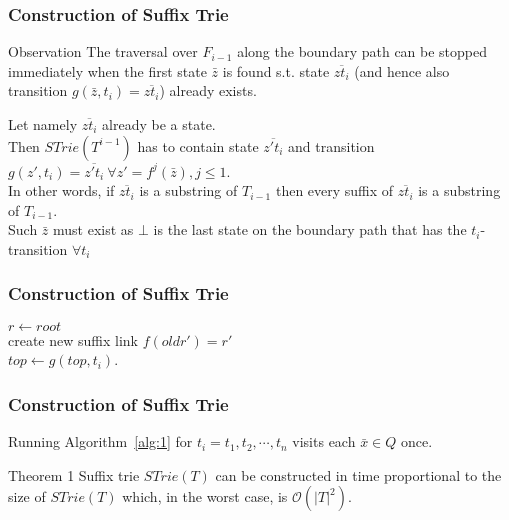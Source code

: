 \documentclass[compress,usenames,dvipsnames]{beamer}
\newenvironment{theoremblock}[1]{
    \setbeamercolor{block title}{bg=Emerald}
    \begin{block}{#1}}{\end{block}
}
\begin{document}
        \begin{frame} \frametitle{Construction of Suffix Trie}
            \begin{block}{Observation}
                The traversal over $F_{i-1}$ along the boundary path can be stopped immediately when the first state $\bar{z}$ is found s.t. state $\overline{zt_i}$ (and hence also transition $g(\bar{z}, t_i) = \overline{zt_i}$) already exists.
            \end{block}
            Let namely $\overline{zt_i}$ already be a state. \\
            \hfill \break
            Then $STrie(T^{i-1})$ has to contain state $\overline{z't_i}$ and transition $g(z', t_i) = \overline{z't_i} \ \forall z' = f^j(\bar{z}), j \leq 1$. \\
            In other words, if $\overline{zt_i}$ is a substring of $T_{i-1}$ then every suffix of $\overline{zt_i}$ is a substring of $T_{i-1}$.\\
            \hfill \break
            Such $\bar{z}$ must exist as $\bot$ is the last state on the boundary path that has the $t_i$-transition $\forall t_i$
        \end{frame}

        \begin{frame}\frametitle{Construction of Suffix Trie}
            \LinesNumbered
            \begin{algorithm}[H]
                \SetAlgoNoEnd
                $r \leftarrow root$ \\
                create new suffix link $f(oldr') = r'$ \\
                $top \leftarrow g(top, t_i)$.
            \caption{}
            \label{alg:1}
            \end{algorithm}
        \end{frame}

        \begin{frame}\frametitle{Construction of Suffix Trie}
            Running Algorithm~\ref{alg:1} for $t_i = t_1, t_2, \cdots, t_n$ visits each $\bar{x} \in Q$ once.
            \begin{theoremblock}{Theorem 1}
                Suffix trie $STrie(T)$ can be constructed in time proportional to
                the size of $STrie(T)$ which, in the worst case, is $\mathcal{O}(|T|^2)$.
            \end{theoremblock}
        \end{frame}
\end{document}
